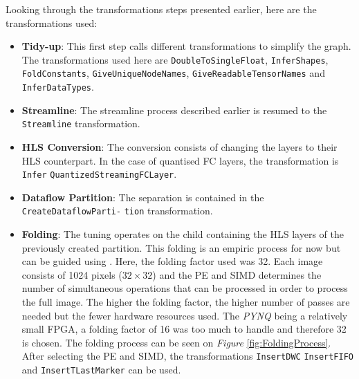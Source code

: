 Looking through the transformations steps presented earlier, here are the transformations used:
\begin{itemize}
  \item \textbf{Tidy-up}: This first step calls different transformations to simplify the graph. The transformations used here are \texttt{DoubleToSingleFloat}, \texttt{InferShapes}, \texttt{FoldConstants}, \texttt{GiveUniqueNodeNames}, \texttt{GiveReadableTensorNames} and \texttt{InferDataTypes}.
  \item \textbf{Streamline}: The streamline process described earlier is resumed to the \texttt{Streamline} transformation.
  \item \textbf{HLS Conversion}: The conversion consists of changing the layers to their HLS counterpart. In the case of quantised FC layers, the transformation is \texttt{Infer} \texttt{QuantizedStreamingFCLayer}.
  \item \textbf{Dataflow Partition}: The separation is contained in the \texttt{CreateDataflowParti-} \texttt{tion} transformation.
  \item \textbf{Folding}: The tuning operates on the child containing the HLS layers of the previously created partition. This folding is an empiric process for now but can be guided using . Here, the folding factor used was 32. Each image consists of 1024 pixels ($32 \times 32$) and the PE and SIMD determines the number of simultaneous operations that can be processed in order to process the full image. The higher the folding factor, the higher number of passes are needed but the fewer hardware resources used. The \emph{PYNQ} being a relatively small FPGA, a folding factor of 16 was too much to handle and therefore 32 is chosen. The folding process can be seen on \emph{Figure} \ref{fig:FoldingProcess}. After selecting the PE and SIMD, the transformations \texttt{InsertDWC} \texttt{InsertFIFO} and \texttt{InsertTLastMarker} can be used.


\end{itemize}
